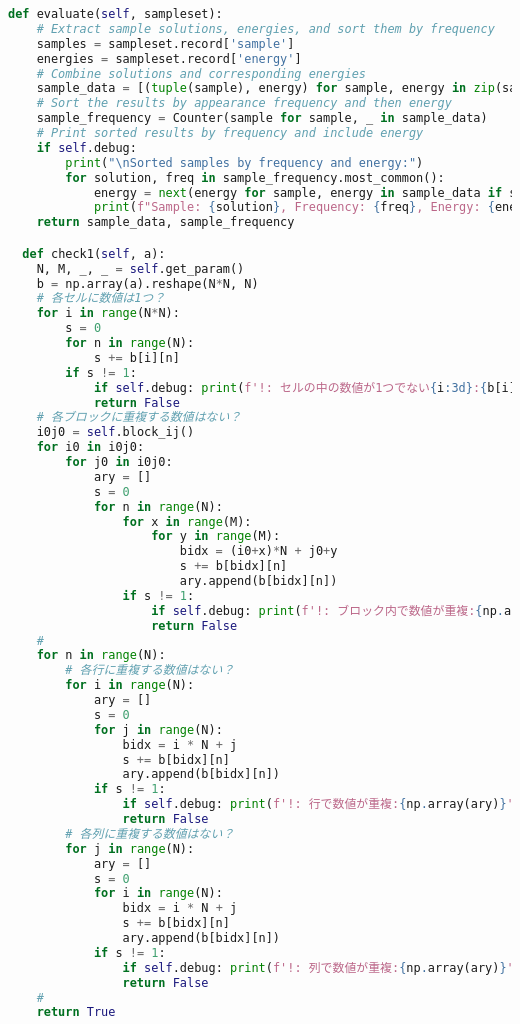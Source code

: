 \documentclass[uplatex,dvipdfmx,a4paper,11pt,oneside,openany]{jsbook}
\begin{document}
\begin{lstlisting}[language=Python]
  def evaluate(self, sampleset):
    # Extract sample solutions, energies, and sort them by frequency
    samples = sampleset.record['sample']
    energies = sampleset.record['energy']
    # Combine solutions and corresponding energies
    sample_data = [(tuple(sample), energy) for sample, energy in zip(samples, energies)]
    # Sort the results by appearance frequency and then energy
    sample_frequency = Counter(sample for sample, _ in sample_data)
    # Print sorted results by frequency and include energy
    if self.debug:
        print("\nSorted samples by frequency and energy:")
        for solution, freq in sample_frequency.most_common():
            energy = next(energy for sample, energy in sample_data if sample == solution)
            print(f"Sample: {solution}, Frequency: {freq}, Energy: {energy:+.2f}")
    return sample_data, sample_frequency

  def check1(self, a):
    N, M, _, _ = self.get_param()
    b = np.array(a).reshape(N*N, N)
    # 各セルに数値は1つ？
    for i in range(N*N):
        s = 0
        for n in range(N):
            s += b[i][n]
        if s != 1:
            if self.debug: print(f'!: セルの中の数値が1つでない{i:3d}:{b[i]}')
            return False
    # 各ブロックに重複する数値はない？
    i0j0 = self.block_ij()
    for i0 in i0j0:
        for j0 in i0j0:
            ary = []
            s = 0
            for n in range(N):
                for x in range(M):
                    for y in range(M):
                        bidx = (i0+x)*N + j0+y
                        s += b[bidx][n]
                        ary.append(b[bidx][n])
                if s != 1:
                    if self.debug: print(f'!: ブロック内で数値が重複:{np.array(ary)}')
                    return False
    #
    for n in range(N):
        # 各行に重複する数値はない？
        for i in range(N):
            ary = []
            s = 0
            for j in range(N):
                bidx = i * N + j
                s += b[bidx][n]
                ary.append(b[bidx][n])
            if s != 1:
                if self.debug: print(f'!: 行で数値が重複:{np.array(ary)}')
                return False
        # 各列に重複する数値はない？
        for j in range(N):
            ary = []
            s = 0
            for i in range(N):
                bidx = i * N + j
                s += b[bidx][n]
                ary.append(b[bidx][n])
            if s != 1:
                if self.debug: print(f'!: 列で数値が重複:{np.array(ary)}')
                return False
    #
    return True


\end{lstlisting}
\end{document}
